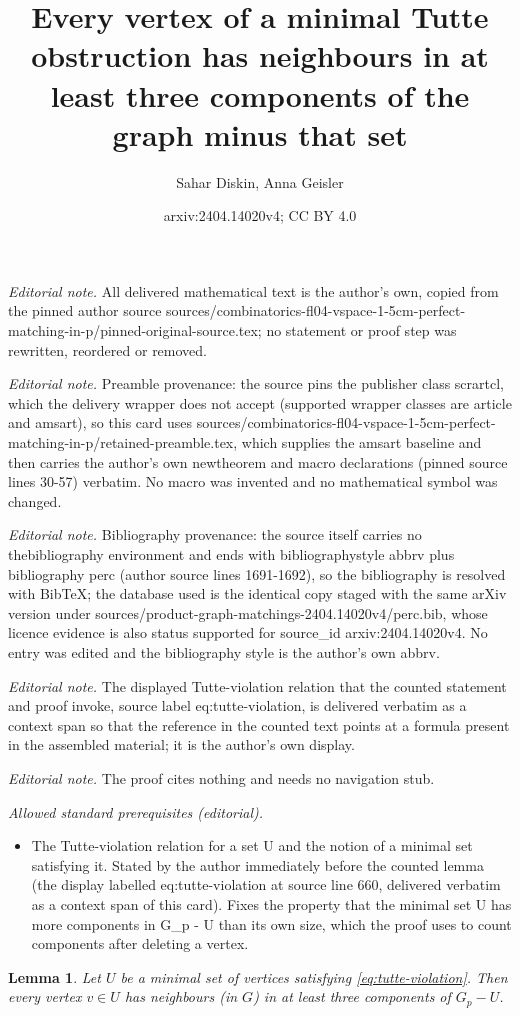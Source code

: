 \documentclass[10pt,a4paper]{amsart}
\title{Every vertex of a minimal Tutte obstruction has neighbours in at least three components of the graph minus that set}
\author{Sahar Diskin, Anna Geisler}
\date{arxiv:2404.14020v4; CC BY 4.0}
\newtheorem{lemma}[thm]{Lemma}
\begin{document}
\maketitle
\noindent\textit{Editorial note.} All delivered mathematical text is the author's own, copied from the pinned author source sources/combinatorics-fl04-vspace-1-5cm-perfect-matching-in-p/pinned-original-source.tex; no statement or proof step was rewritten, reordered or removed.\par\medskip
\noindent\textit{Editorial note.} Preamble provenance: the source pins the publisher class scrartcl, which the delivery wrapper does not accept (supported wrapper classes are article and amsart), so this card uses sources/combinatorics-fl04-vspace-1-5cm-perfect-matching-in-p/retained-preamble.tex, which supplies the amsart baseline and then carries the author's own newtheorem and macro declarations (pinned source lines 30-57) verbatim. No macro was invented and no mathematical symbol was changed.\par\medskip
\noindent\textit{Editorial note.} Bibliography provenance: the source itself carries no thebibliography environment and ends with bibliographystyle abbrv plus bibliography perc (author source lines 1691-1692), so the bibliography is resolved with BibTeX; the database used is the identical copy staged with the same arXiv version under sources/product-graph-matchings-2404.14020v4/perc.bib, whose licence evidence is also status supported for source\_id arxiv:2404.14020v4. No entry was edited and the bibliography style is the author's own abbrv.\par\medskip
\noindent\textit{Editorial note.} The displayed Tutte-violation relation that the counted statement and proof invoke, source label eq:tutte-violation, is delivered verbatim as a context span so that the reference in the counted text points at a formula present in the assembled material; it is the author's own display.\par\medskip
\noindent\textit{Editorial note.} The proof cites nothing and needs no navigation stub.\par\medskip
\noindent\textit{Allowed standard prerequisites (editorial).}\begin{itemize}
\item The Tutte-violation relation for a set U and the notion of a minimal set satisfying it. Stated by the author immediately before the counted lemma (the display labelled eq:tutte-violation at source line 660, delivered verbatim as a context span of this card). Fixes the property that the minimal set U has more components in G\_p - U than its own size, which the proof uses to count components after deleting a vertex.
\end{itemize}\medskip
\begin{lemma} \label{lem:three_edges}
Let $U$ be a minimal set of vertices satisfying \eqref{eq:tutte-violation}. Then every vertex $v \in U$ has neighbours (in $G$) in at least three components of $G_p-U$.
\end{lemma}
\end{document}
